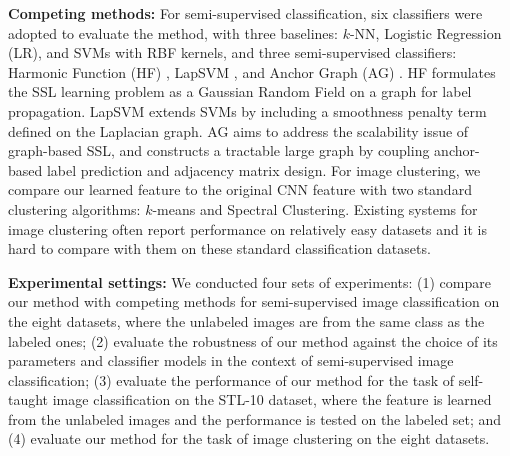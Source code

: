 

\textbf{Competing methods:} For semi-supervised classification, six
classifiers were adopted to evaluate the method, with three baselines:
$k$-NN, Logistic Regression (LR), and SVMs with RBF kernels, and three
semi-supervised classifiers: Harmonic Function (HF)
\citep{Zhu:Harmonic:03}, LapSVM \citep{Belkin:semiframe:2006}, and
Anchor Graph (AG) \citep{icml10:large:graph:ssl}. HF formulates the SSL
learning problem as a Gaussian Random Field on a graph for label
propagation. LapSVM extends SVMs by including a smoothness penalty
term defined on the Laplacian graph. AG aims to address the
scalability issue of graph-based SSL, and constructs a tractable large
graph by coupling anchor-based label prediction and adjacency matrix
design.  For image clustering, we compare our learned feature to the
original CNN feature with two standard clustering algorithms: $k$-means
and Spectral Clustering. Existing systems for image clustering often
report performance on relatively easy datasets and it is hard to compare
with them on these standard classification datasets.


\textbf{Experimental settings:} We conducted four sets of experiments:
(1) compare our method with competing methods for semi-supervised
image classification on the eight datasets, where the unlabeled images
are from the same class as the labeled ones; (2) evaluate the
robustness of our method against the choice of its parameters and classifier models
in the context of semi-supervised image classification; (3) evaluate
the performance of our method for the task of self-taught image
classification on the STL-10 dataset, where the feature is learned from
the unlabeled images and the performance is tested on the labeled set;
and (4) evaluate our method for the task of image clustering on the
eight datasets.

